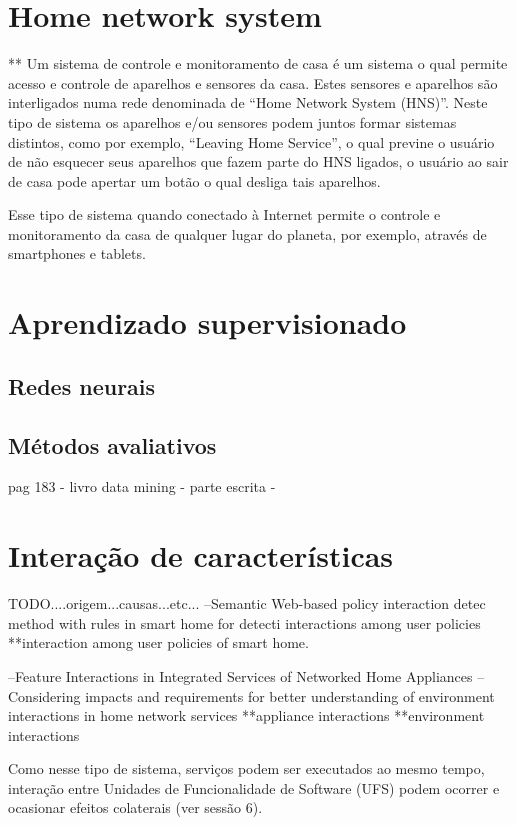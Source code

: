 \section{Home network system}
\label{sec:hns}
**
Um sistema de controle e monitoramento de casa é um sistema o qual permite acesso e controle de aparelhos e sensores da casa. Estes sensores e aparelhos são interligados numa rede denominada de “Home Network System (HNS)”. Neste tipo de sistema os aparelhos e/ou sensores podem juntos formar sistemas distintos, como por exemplo, “Leaving Home Service”, o qual previne o usuário de não esquecer seus aparelhos que fazem parte do HNS ligados, o usuário ao sair de casa pode apertar um botão o qual desliga tais aparelhos.\cite{Nakamura:2009}

Esse tipo de sistema quando conectado à Internet permite o controle e monitoramento da casa de qualquer lugar do planeta, por exemplo, através de smartphones e tablets.\cite{Piyare:2013}
\section{Aprendizado supervisionado}

\subsection{Redes neurais}

\subsection{Métodos avaliativos}
\cite{Witten:2005} pag 183 - livro data mining - parte escrita - 

\section{Interação de características}
TODO....origem...causas...etc...
--Semantic Web-based policy interaction detec method with rules in smart home for detecti interactions among user policies
**interaction among user policies of smart home.

--Feature Interactions in Integrated Services of Networked Home Appliances
--Considering impacts and requirements for better understanding of environment interactions in home network services
**appliance interactions
**environment interactions


Como nesse tipo de sistema, serviços podem ser executados ao mesmo tempo, interação entre Unidades de Funcionalidade de Software (UFS) podem ocorrer e ocasionar efeitos colaterais (ver sessão 6).\cite{Ikegami:2013}
